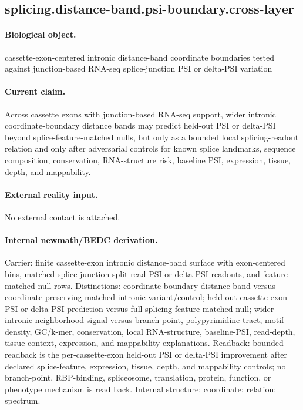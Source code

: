\subsection{splicing.distance-band.psi-boundary.cross-layer}

\paragraph{Biological object.} cassette-exon-centered intronic distance-band coordinate boundaries tested against junction-based RNA-seq splice-junction PSI or delta-PSI variation

\paragraph{Current claim.} Across cassette exons with junction-based RNA-seq support, wider intronic coordinate-boundary distance bands may predict held-out PSI or delta-PSI beyond splice-feature-matched nulls, but only as a bounded local splicing-readout relation and only after adversarial controls for known splice landmarks, sequence composition, conservation, RNA-structure risk, baseline PSI, expression, tissue, depth, and mappability.

\paragraph{External reality input.}
No external contact is attached.

\paragraph{Internal newmath/BEDC derivation.} Carrier: finite cassette-exon intronic distance-band surface with exon-centered bins, matched splice-junction split-read PSI or delta-PSI readouts, and feature-matched null rows. Distinctions: coordinate-boundary distance band versus coordinate-preserving matched intronic variant/control; held-out cassette-exon PSI or delta-PSI prediction versus full splicing-feature-matched null; wider intronic neighborhood signal versus branch-point, polypyrimidine-tract, motif-density, GC/k-mer, conservation, local RNA-structure, baseline-PSI, read-depth, tissue-context, expression, and mappability explanations. Readback: bounded readback is the per-cassette-exon held-out PSI or delta-PSI improvement after declared splice-feature, expression, tissue, depth, and mappability controls; no branch-point, RBP-binding, spliceosome, translation, protein, function, or phenotype mechanism is read back. Internal structure: coordinate; relation; spectrum.


